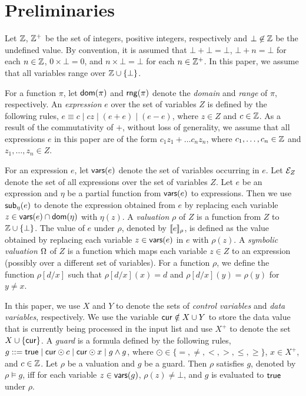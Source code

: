 
\section{Preliminaries}
%
Let ${\mathbb{Z} }$,  ${\mathbb{Z} }^+$ be the set of integers, positive integers, respectively and $\bot \not \in {\mathbb{Z} }$ be  the undefined value. By convention, it is assumed that $\bot + \bot = \bot$, $\bot + n = \bot$ for each $n \in {\mathbb{Z} }$, $0 \times \bot = 0$, and $n \times \bot = \bot$ for each $n \in {\mathbb{Z} }^+$.
In this paper, we assume that all variables range over ${\mathbb{Z} } \cup \{\bot\}$.  

For a function $\pi$, let $\mathsf{dom}(\pi)$ and $\mathsf{rng}(\pi)$ denote the \emph{domain}  and \emph{range} of $\pi$, respectively. 
An \emph{expression} $e$ over the set of variables $Z$ is defined by the following rules, $e\equiv  c \mid  c z \mid (e + e) \mid (e - e)$, where $z \in Z$ and $c\in {\mathbb{Z} }$.  As a result of the commutativity of $+$, without loss of generality, we assume that all expressions $e$ in this paper are of the form $c_1 z_1 + \dots c_n z_n$, where $c_1,\dots,c_n \in {\mathbb{Z} }$ and $z_1,\dots,z_n \in Z$. %

For an expression $e$, let $\mathsf{vars}(e)$ denote the set of variables occurring in $e$. Let ${\mathcal{E} }_Z$ denote the set of all expressions over the set of variables $Z$. Let $e$ be an expression and $\eta$ be a partial function from $\mathsf{vars}(e)$ to expressions. Then we use $\mathsf{sub}_{\eta}(e)$ to denote the expression obtained from $e$ by replacing each variable $z \in \mathsf{vars}(e)\cap\mathsf{dom}(\eta)$ with $\eta(z)$. A \emph{valuation} $\rho$ of $Z$ is a function from $Z$ to ${\mathbb{Z} }\cup\{\bot\}$. The value of $e$ under $\rho$, denoted by $\llbracket e\rrbracket_{\rho}$, is defined as the value obtained by replacing each variable $z \in \mathsf{vars}(e)$ in $e$ with $\rho(z)$.
A \emph{symbolic valuation} $\Omega$ of $Z$ is a function which maps each variable $z \in Z$ to an expression (possibly over a different set of variables). 
For a function $\rho$, we define the function $\rho[d/x]$ such that $\rho[d/x](x)=d$ and $\rho[d/x](y)=\rho(y)$ for $y\neq x$. 

In this paper, we use $X$ and $Y$ to denote the sets of \emph{control variables} and \emph{data variables}, respectively. We use the variable $\mathsf{cur} \notin X\cup Y$ to store the data value that is currently being processed in the input list and use $X^+$ to denote the set $X\cup \{\mathsf{cur}\}$.
A \emph{guard} is a formula defined by the following rules, $g::= \mathsf{true} \mid \mathsf{cur}\odot c \mid \mathsf{cur}\odot x \mid g \wedge g$, where $\odot \in \{=,\neq,<, >, \le, \ge\}$, $x \in X^+$, and $c\in {\mathbb{Z} }$. 
Let $\rho$ be a valuation and $g$ be a guard. Then $\rho$ satisfies $g$, denoted by $\rho \models g$, iff for each variable $z \in \mathsf{vars}(g)$, $\rho(z) \neq \bot$, and $g$ is evaluated to $\mathsf{true}$ under $\rho$. 

